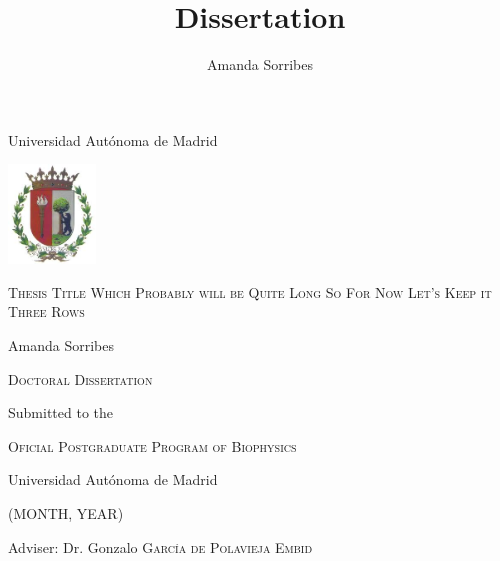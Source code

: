 \cleardoublepage
{}
\begin{titlepage}

\begin{center}

{\large Universidad Autónoma de Madrid}
\vspace{0.3cm}

\includegraphics[width=0.175\textwidth]{Frontmatter/Escudo_UAM}
\vspace{2.2cm}

\fontsize{30}{24}\selectfont
\textsc{ \huge Thesis Title Which Probably will be Quite Long So For Now Let's Keep it Three Rows}
\vspace{2.0cm}

\fontsize{11}{13}\selectfont
{\LARGE  Amanda Sorribes}
\vspace{3.6cm}

{\large \textsc{Doctoral Dissertation}}%
\vspace{0.16cm}

{\large Submitted to the}
\vspace{0.16cm}

\textsc{\large Oficial Postgraduate Program of Biophysics}%
\vspace{0.16cm}

{\large Universidad Autónoma de Madrid}
\vspace{0.16cm}

{\normalsize (MONTH, YEAR)}

\vfill

{\large Adviser: Dr. Gonzalo \textsc{García de Polavieja Embid}}
\vspace{0.15cm}


\vfill


\end{center}
\restoregeometry
\end{titlepage}

\thispagestyle{empty}

\title{Dissertation}
\author{Amanda Sorribes}
